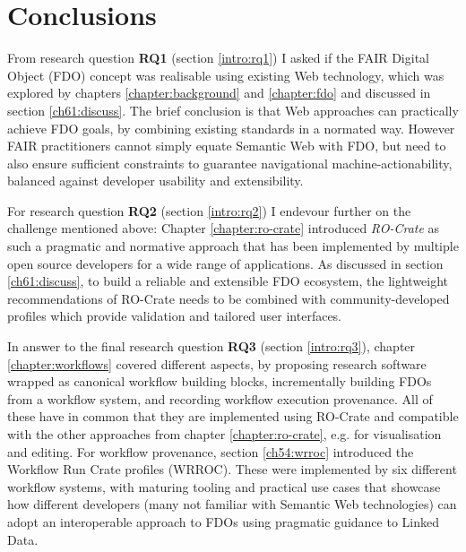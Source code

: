 \section{Conclusions}


From research question \textbf{RQ1} (section \vref{intro:rq1}) I asked if the FAIR Digital Object (FDO) concept was realisable using existing Web technology, which was explored by chapters \ref{chapter:background} and \ref{chapter:fdo} and discussed in section \ref{ch61:discuss}. The brief conclusion is that Web approaches can practically achieve FDO goals, by combining existing standards in a normated way. However FAIR practitioners cannot simply equate Semantic Web with FDO, but need to also ensure sufficient constraints to guarantee navigational machine-actionability, balanced against developer usability and extensibility. 

For research question \textbf{RQ2} (section \vref{intro:rq2}) I endevour further on the challenge mentioned above: Chapter \ref{chapter:ro-crate} introduced \emph{RO-Crate} as such a pragmatic and normative approach that has been implemented by multiple open source developers for a wide range of applications. As discussed in section \ref{ch61:discuss}, to build a reliable and extensible FDO ecosystem, the lightweight recommendations of RO-Crate needs to be combined with community-developed profiles which provide validation and tailored user interfaces.

In answer to the final research question \textbf{RQ3} (section \vref{intro:rq3}), chapter \ref{chapter:workflows} covered different aspects, by proposing research software wrapped as canonical workflow building blocks, incrementally building FDOs from a workflow system, and recording workflow execution provenance. All of these have in common that they are implemented using RO-Crate and compatible with the other approaches from chapter \ref{chapter:ro-crate}, e.g. for visualisation and editing. For workflow provenance, section \vref{ch54:wrroc} introduced the Workflow Run Crate profiles (WRROC). These were implemented by six different workflow systems, with maturing tooling and practical use cases that showcase how different developers (many not familiar with Semantic Web technologies) can adopt an interoperable approach to FDOs using pragmatic guidance to Linked Data.


